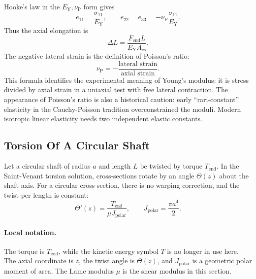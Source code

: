 Hooke's law in the \(E_{\mathrm Y},\nu_{\mathrm P}\) form gives
\[
  e_{11}=\frac{\sigma_{11}}{E_{\mathrm Y}},
  \qquad
  e_{22}=e_{33}=-\nu_{\mathrm P}\frac{\sigma_{11}}{E_{\mathrm Y}}.
\]
Thus the axial elongation is
\[
  \boxed{
  \Delta L
  =
  \frac{F_{\mathrm{end}}L}{E_{\mathrm Y}A_{\mathrm{cs}}}.
  }
\]
The negative lateral strain is the definition of Poisson's ratio:
\[
  \nu_{\mathrm P}
  =
  -\frac{\text{lateral strain}}{\text{axial strain}}.
\]
This formula identifies the experimental meaning of Young's modulus: it is
stress divided by axial strain in a uniaxial test with free lateral
contraction.
The appearance of Poisson's ratio is also a historical caution: early
``rari-constant'' elasticity in the Cauchy-Poisson tradition overconstrained
the moduli. Modern isotropic linear elasticity needs two independent elastic
constants.

\subsection{Torsion Of A Circular Shaft}
\label{subsec:circular-shaft-torsion}

Let a circular shaft of radius \(a\) and length \(L\) be twisted by torque
\(T_{\mathrm{end}}\). In the Saint-Venant torsion solution, cross-sections
rotate by an angle \(\Theta(z)\) about the shaft axis. For a circular cross
section, there is no warping correction, and the twist per length is constant:
\[
  \Theta'(z)=\frac{T_{\mathrm{end}}}{\mu J_{\mathrm{polar}}},
  \qquad
  J_{\mathrm{polar}}=\frac{\pi a^4}{2}.
\]

\paragraph{Local notation.}
The torque is \(T_{\mathrm{end}}\), while the kinetic energy symbol \(T\) is no
longer in use here.  The axial coordinate is \(z\), the twist angle is
\(\Theta(z)\), and \(J_{\mathrm{polar}}\) is a geometric polar moment of area.
The Lame modulus \(\mu\) is the shear modulus in this section.

